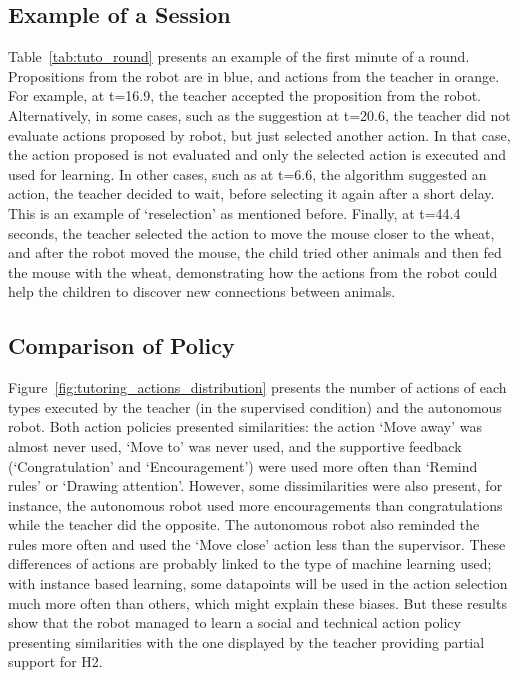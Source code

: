 \subsection{Example of a Session}

Table~\ref{tab:tuto_round} presents an example of the first minute of a round. Propositions from the robot are in blue, and actions from the teacher in orange. For example, at t=16.9, the teacher accepted the proposition from the robot. Alternatively, in some cases, such as the suggestion at t=20.6, the teacher did not evaluate actions proposed by robot, but just selected another action. In that case, the action proposed is not evaluated and only the selected action is executed and used for learning. In other cases, such as at t=6.6, the algorithm suggested an action, the teacher decided to wait, before selecting it again after a short delay. This is an example of `reselection' as mentioned before. Finally, at t=44.4 seconds, the teacher selected the action to move the mouse closer to the wheat, and after the robot moved the mouse, the child tried other animals and then fed the mouse with the wheat, demonstrating how the actions from the robot could help the children to discover new connections between animals.


\subsection{Comparison of Policy}

Figure~\ref{fig:tutoring_actions_distribution} presents the number of actions of each types executed by the teacher (in the supervised condition) and the autonomous robot. Both action policies presented similarities: the action `Move away' was almost never used, `Move to' was never used, and the supportive feedback (`Congratulation' and `Encouragement') were used more often than `Remind rules' or `Drawing attention'. However, some dissimilarities were also present, for instance, the autonomous robot used more encouragements than congratulations while the teacher did the opposite. The autonomous robot also reminded the rules more often and used the `Move close' action less than the supervisor. These differences of actions are probably linked to the type of machine learning used; with instance based learning, some datapoints will be used in the action selection much more often than others, which might explain these biases. But these results show that the robot managed to learn a social and technical action policy presenting similarities with the one displayed by the teacher providing partial support for H2.

